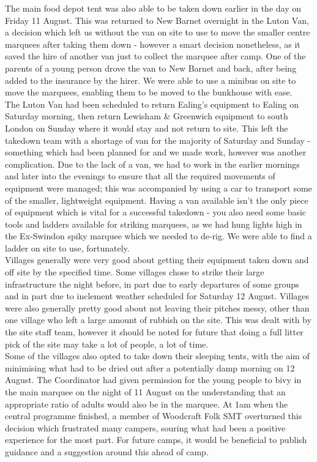 The main food depot tent was also able to be taken down earlier in the day on Friday 11 August. This was returned to New Barnet overnight in the Luton Van, a decision which left us without the van on site to use to move the smaller centre marquees after taking them down - however a smart decision nonetheless, as it saved the hire of another van just to collect the marquee after camp. One of the parents of a young person drove the van to New Barnet and back, after being added to the insurance by the hirer. We were able to use a minibus on site to move the marquees, enabling them to be moved to the bunkhouse with ease. \\

The Luton Van had been scheduled to return Ealing's equipment to Ealing on Saturday morning, then return Lewisham \& Greenwich equipment to south London on Sunday where it would stay and not return to site. This left the takedown team with a shortage of van for the majority of Saturday and Sunday - something which had been planned for and we made work, however was another complication. Due to the lack of a van, we had to work in the earlier mornings and later into the evenings to ensure that all the required movements of equipment were managed; this was accompanied by using a car to transport some of the smaller, lightweight equipment. Having a van available isn't the only piece of equipment which is vital for a successful takedown - you also need some basic tools and ladders available for striking marquees, as we had hung lights high in the Ex-Swindon spiky marquee which we needed to de-rig. We were able to find a ladder on site to use, fortunately. \\

Villages generally were very good about getting their equipment taken down and off site by the specified time. Some villages chose to strike their large infrastructure the night before, in part due to early departures of some groups and in part due to inclement weather scheduled for Saturday 12 August. Villages were also generally pretty good about not leaving their pitches messy, other than one village who left a large amount of rubbish on the site. This was dealt with by the site staff team, however it should be noted for future that doing a full litter pick of the site may take a lot of people, a lot of time. \\

Some of the villages also opted to take down their sleeping tents, with the aim of minimising what had to be dried out after a potentially damp morning on 12 August. The Coordinator had given permission for the young people to bivy in the main marquee on the night of 11 August on the understanding that an appropriate ratio of adults would also be in the marquee. At 1am when the central programme finished, a member of Woodcraft Folk SMT overturned this decision which frustrated many campers, souring what had been a positive experience for the most part. For future camps, it would be beneficial to publish guidance and a suggestion around this ahead of camp. \\

